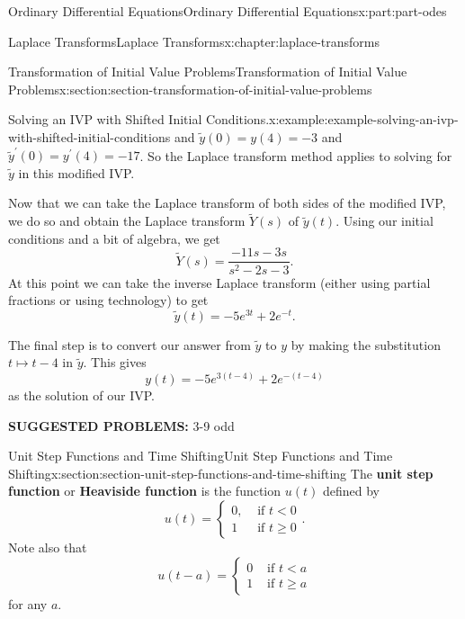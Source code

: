 \documentclass[oneside,10pt,]{book}
\newcommand{\terminology}[1]{\textbf{#1}}
\numberwithin{equation}{part}
\newcommand{\lt}{<}
\newcommand{\amp}{&}
\begin{document}
\begin{partptx}{Ordinary Differential Equations}{}{Ordinary Differential Equations}{}{}{x:part:part-odes}
\begin{chapterptx}{Laplace Transforms}{}{Laplace Transforms}{}{}{x:chapter:laplace-transforms}
\begin{sectionptx}{Transformation of Initial Value Problems}{}{Transformation of Initial Value Problems}{}{}{x:section:section-transformation-of-initial-value-problems}
\begin{example}{Solving an IVP with Shifted Initial Conditions.}{x:example:example-solving-an-ivp-with-shifted-initial-conditions}
and \(\widetilde{y}(0) = y(4) = -3\) and \(\widetilde{y}^\prime(0) = y^\prime(4) = -17\). So the Laplace transform method applies to solving for \(\widetilde{y}\) in this modified IVP.%
\par
Now that we can take the Laplace transform of both sides of the modified IVP, we do so and obtain the Laplace transform \(\widetilde{Y}(s)\) of \(\widetilde{y}(t)\). Using our initial conditions and a bit of algebra, we get%
\begin{equation*}
\widetilde{Y}(s) = \frac{-11s-3s}{s^2-2s-3}.
\end{equation*}
At this point we can take the inverse Laplace transform (either using partial fractions or using technology) to get%
\begin{equation*}
\widetilde{y}(t) = -5e^{3t} + 2e^{-t}.
\end{equation*}
%
\par
The final step is to convert our answer from \(\widetilde{y}\) to \(y\) by making the substitution \(t\mapsto t-4\) in \(\widetilde{y}\). This gives%
\begin{equation*}
y(t) = -5e^{3(t-4)} + 2e^{-(t-4)}
\end{equation*}
as the solution of our IVP.%
\end{example}
\terminology{SUGGESTED PROBLEMS:} 3-9 odd\end{sectionptx}
%
%
\typeout{************************************************}
\typeout{************************************************}
%
\begin{sectionptx}{Unit Step Functions and Time Shifting}{}{Unit Step Functions and Time Shifting}{}{}{x:section:section-unit-step-functions-and-time-shifting}
The \terminology{unit step function} or \terminology{Heaviside function} is the function \(u(t)\) defined by%
\begin{equation*}
u(t) = \begin{cases}
0, \amp\text{ if }t\lt 0\\
1 \amp\text{ if } t\geq0
\end{cases}.
\end{equation*}
Note also that%
\begin{equation*}
u(t-a) = \begin{cases}
0 \amp\text{ if }t\lt a\\
1 \amp\text{ if } t\geq a
\end{cases}
\end{equation*}
for any \(a\).%
\par

\end{sectionptx}
\end{chapterptx}
\end{partptx}
\end{document}
